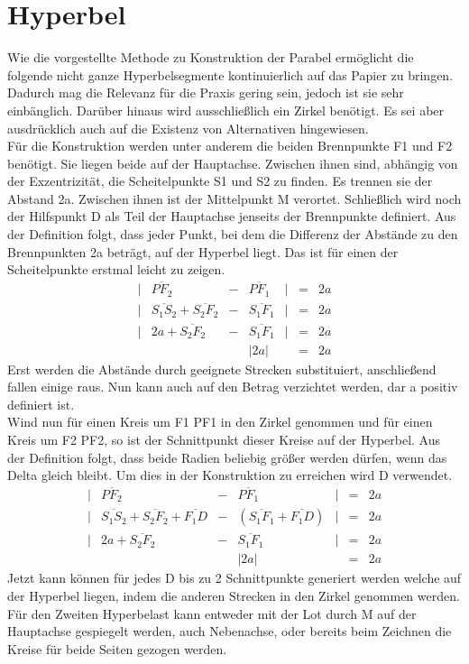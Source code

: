 \section{Hyperbel}
Wie die vorgestellte Methode zu Konstruktion der Parabel ermöglicht die folgende nicht ganze Hyperbelsegmente kontinuierlich auf das Papier zu bringen. Dadurch mag die Relevanz für die Praxis gering sein, jedoch ist sie sehr einbänglich. Darüber hinaus wird ausschließlich ein Zirkel benötigt. Es sei aber ausdrücklich auch auf die Existenz von Alternativen hingewiesen.\\
Für die Konstruktion werden unter anderem die beiden Brennpunkte F1 und F2 benötigt. Sie liegen beide auf der Hauptachse. Zwischen ihnen sind, abhängig von der Exzentrizität, die Scheitelpunkte S1 und S2 zu finden. Es trennen sie der Abstand 2a. Zwischen ihnen ist der Mittelpunkt M verortet. Schließlich wird noch der Hilfspunkt D als Teil der Hauptachse jenseits der Brennpunkte definiert.
Aus der Definition folgt, dass jeder Punkt, bei dem die Differenz der Abstände zu den Brennpunkten 2a beträgt, auf der Hyperbel liegt. Das ist für einen der Scheitelpunkte erstmal leicht zu zeigen.
\begin{displaymath}
	\begin{array}{lcccrcl}
		|&\overline{{PF}_2} & - & \overline{{PF}_1}&| & = & 2a\\
		|&\overline{{S}_1{S}_2}+\overline{{S}_2{F}_2} & - & \overline{{S}_1{F}_1}&| & = & 2a\\
		|&2a+\overline{{S}_2{F}_2} & - & \overline{{S}_1{F}_1}&| & = & 2a\\
		&&&|2a| && = & 2a
	\end{array}
\end{displaymath}
Erst werden die Abstände durch geeignete Strecken substituiert, anschließend fallen einige raus. Nun kann auch auf den Betrag verzichtet werden, dar a positiv definiert ist.\\
Wind nun für einen Kreis um F1 PF1 in den Zirkel genommen und für einen Kreis um F2 PF2, so ist der Schnittpunkt dieser Kreise auf der Hyperbel. Aus der Definition folgt, dass beide Radien beliebig größer werden dürfen, wenn das Delta gleich bleibt. Um dies in der Konstruktion zu erreichen wird D verwendet.
\begin{displaymath}
	\begin{array}{lcccrcl}
		|&\overline{{PF}_2} & - & \overline{{PF}_1}&| & = & 2a\\
		|&\overline{{S}_1{S}_2}+\overline{{S}_2{F}_2}+\overline{{F}_1{D}} & - & (\overline{{S}_1{F}_1}+\overline{{F}_1{D}})&| & = & 2a\\
		|&2a+\overline{{S}_2{F}_2} & - & \overline{{S}_1{F}_1}&| & = & 2a\\
		&&&|2a| && = & 2a
	\end{array}
\end{displaymath}
Jetzt kann können für jedes D bis zu 2 Schnittpunkte generiert werden welche auf der Hyperbel liegen, indem die anderen Strecken in den Zirkel genommen werden. Für den Zweiten Hyperbelast kann entweder mit der Lot durch M auf der Hauptachse gespiegelt werden, auch Nebenachse, oder bereits beim Zeichnen die Kreise für beide Seiten gezogen werden.\\